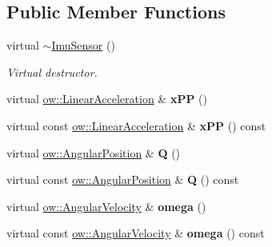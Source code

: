\subsection*{Public Member Functions}
\begin{DoxyCompactItemize}
\item 
virtual \hyperlink{classow__core_1_1ImuSensor_a55b5d5c2eae34935895d795b0a52b2f4}{$\sim$\+Imu\+Sensor} ()\hypertarget{classow__core_1_1ImuSensor_a55b5d5c2eae34935895d795b0a52b2f4}{}\label{classow__core_1_1ImuSensor_a55b5d5c2eae34935895d795b0a52b2f4}

\begin{DoxyCompactList}\small\item\em Virtual destructor. \end{DoxyCompactList}\item 
virtual \hyperlink{classow__core_1_1LinearAcceleration}{ow\+::\+Linear\+Acceleration} \& {\bfseries x\+PP} ()\hypertarget{classow__core_1_1ImuSensor_a87e3346cbdc77f088ef65bf195cebbf9}{}\label{classow__core_1_1ImuSensor_a87e3346cbdc77f088ef65bf195cebbf9}

\item 
virtual const \hyperlink{classow__core_1_1LinearAcceleration}{ow\+::\+Linear\+Acceleration} \& {\bfseries x\+PP} () const \hypertarget{classow__core_1_1ImuSensor_aee32886eb5a0641d0744604202fb8b94}{}\label{classow__core_1_1ImuSensor_aee32886eb5a0641d0744604202fb8b94}

\item 
virtual \hyperlink{classow__core_1_1AngularPosition}{ow\+::\+Angular\+Position} \& {\bfseries Q} ()\hypertarget{classow__core_1_1ImuSensor_a61e9b747b8e5afc8f68430b832398f52}{}\label{classow__core_1_1ImuSensor_a61e9b747b8e5afc8f68430b832398f52}

\item 
virtual const \hyperlink{classow__core_1_1AngularPosition}{ow\+::\+Angular\+Position} \& {\bfseries Q} () const \hypertarget{classow__core_1_1ImuSensor_a13a6959acd7c32de7455f5494bd5b901}{}\label{classow__core_1_1ImuSensor_a13a6959acd7c32de7455f5494bd5b901}

\item 
virtual \hyperlink{classow__core_1_1AngularVelocity}{ow\+::\+Angular\+Velocity} \& {\bfseries omega} ()\hypertarget{classow__core_1_1ImuSensor_a5db93b43211a8175a07dd35a5fc02cd8}{}\label{classow__core_1_1ImuSensor_a5db93b43211a8175a07dd35a5fc02cd8}

\item 
virtual const \hyperlink{classow__core_1_1AngularVelocity}{ow\+::\+Angular\+Velocity} \& {\bfseries omega} () const \hypertarget{classow__core_1_1ImuSensor_af8c0d8a68476139c42a34b4a13d03ce0}{}\label{classow__core_1_1ImuSensor_af8c0d8a68476139c42a34b4a13d03ce0}

\end{DoxyCompactItemize}
